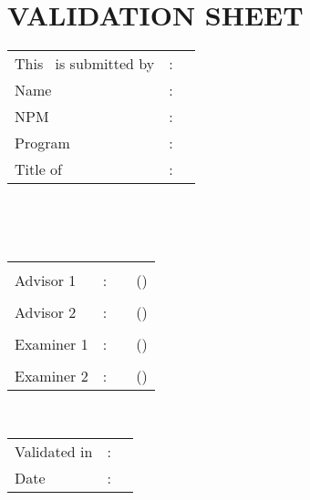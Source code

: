 %
%
%

\chapter*{VALIDATION SHEET}

\vspace*{0.4cm}
\noindent

\noindent
\begin{tabular}{ll p{9cm}}
	This \type\ is submitted by&: & \\
	Name&: & \penulis \\
	NPM&: & \npm \\
	Program&: & \program \\
	Title of \type&: & \judul \\
\end{tabular} \\

\vspace*{1.0cm}

\noindent {}\\[0.2cm]

\begin{center}
\end{center}

\vspace*{0.3cm}

\begin{tabular}{l l l l }
	& & & \\
	Advisor 1&: & \pembimbingSatu & (\hspace*{3.0cm}) \\
	& & & \\
	Advisor 2&: & \pembimbingDua & (\hspace*{3.0cm}) \\
	& & & \\
	Examiner 1&: & \pengujiSatu & (\hspace*{3.0cm}) \\
	& & & \\
	Examiner 2&: & \pengujiDua & (\hspace*{3.0cm}) \\
\end{tabular}\\

\vspace*{2.0cm}

\begin{tabular}{ll l}
	Validated in&: & \kota \\
	Date&: & \tanggalLulus \\
\end{tabular}


\newpage

